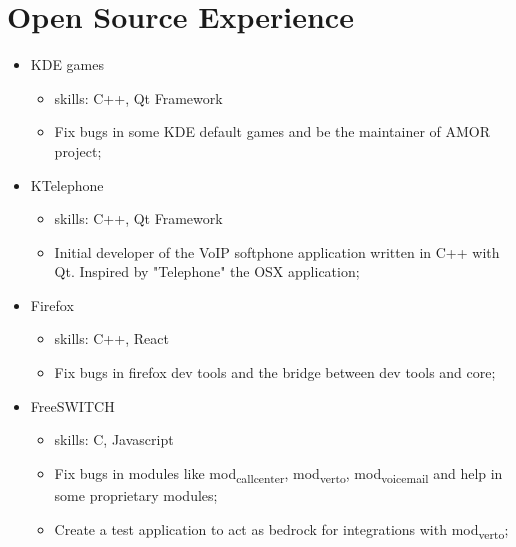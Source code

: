 \documentclass[
]{article}
\providecommand{\tightlist}{%
  \setlength{\itemsep}{0pt}\setlength{\parskip}{0pt}}
\begin{document}
\hypertarget{open-source-experience}{%
\section{Open Source Experience}\label{open-source-experience}}

\begin{itemize}
\tightlist
\item
  KDE games

  \begin{itemize}
  \tightlist
  \item
    skills: C++, Qt Framework
  \item
    Fix bugs in some KDE default games and be the maintainer of AMOR
    project;
  \end{itemize}
\end{itemize}

\vspace{2mm}

\begin{itemize}
\tightlist
\item
  KTelephone

  \begin{itemize}
  \tightlist
  \item
    skills: C++, Qt Framework
  \item
    Initial developer of the VoIP softphone application written in C++
    with Qt. Inspired by "Telephone" the OSX application;
  \end{itemize}
\end{itemize}

\vspace{2mm}

\begin{itemize}
\tightlist
\item
  Firefox

  \begin{itemize}
  \tightlist
  \item
    skills: C++, React
  \item
    Fix bugs in firefox dev tools and the bridge between dev tools and
    core;
  \end{itemize}
\end{itemize}

\vspace{2mm}

\begin{itemize}
\tightlist
\item
  FreeSWITCH

  \begin{itemize}
  \tightlist
  \item
    skills: C, Javascript
  \item
    Fix bugs in modules like mod\textsubscript{callcenter},
    mod\textsubscript{verto}, mod\textsubscript{voicemail} and help in
    some proprietary modules;
  \item
    Create a test application to act as bedrock for integrations with
    mod\textsubscript{verto};
  \end{itemize}
\end{itemize}
\end{document}
